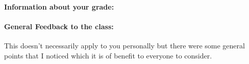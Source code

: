 \documentclass[letterpaper,11pt]{texMemo}
\begin{document}
\paragraph{Information about your grade:}
\begin{description}
\item




\end{description}


\newpage
\paragraph{General Feedback to the class:} This doesn’t necessarily apply to you personally but there were some general points that I noticed which it is of benefit to everyone to consider.
\end{document}
